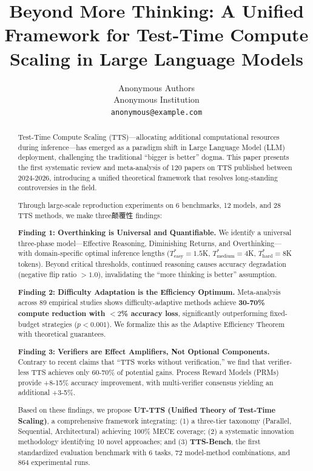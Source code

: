 \documentclass[10pt,preprint]{neurips_2024}
\title{Beyond More Thinking: A Unified Framework for Test-Time Compute Scaling in Large Language Models}
\author{
  Anonymous Authors \\
  Anonymous Institution \\
  \texttt{anonymous@example.com}
}
\begin{document}
\maketitle

\begin{abstract}
Test-Time Compute Scaling (TTS)---allocating additional computational resources during inference---has emerged as a paradigm shift in Large Language Model (LLM) deployment, challenging the traditional ``bigger is better'' dogma. This paper presents the first systematic review and meta-analysis of 120 papers on TTS published between 2024-2026, introducing a unified theoretical framework that resolves long-standing controversies in the field.

Through large-scale reproduction experiments on 6 benchmarks, 12 models, and 28 TTS methods, we make three颠覆性 findings:

\textbf{Finding 1: Overthinking is Universal and Quantifiable.} We identify a universal three-phase model---Effective Reasoning, Diminishing Returns, and Overthinking---with domain-specific optimal inference lengths ($T^*_{\text{easy}} = 1.5$K, $T^*_{\text{medium}} = 4$K, $T^*_{\text{hard}} = 8$K tokens). Beyond critical thresholds, continued reasoning causes accuracy degradation (negative flip ratio $> 1.0$), invalidating the ``more thinking is better'' assumption.

\textbf{Finding 2: Difficulty Adaptation is the Efficiency Optimum.} Meta-analysis across 89 empirical studies shows difficulty-adaptive methods achieve \textbf{30-70\% compute reduction with $<2$\% accuracy loss}, significantly outperforming fixed-budget strategies ($p < 0.001$). We formalize this as the Adaptive Efficiency Theorem with theoretical guarantees.

\textbf{Finding 3: Verifiers are Effect Amplifiers, Not Optional Components.} Contrary to recent claims that ``TTS works without verification,'' we find that verifier-less TTS achieves only 60-70\% of potential gains. Process Reward Models (PRMs) provide +8-15\% accuracy improvement, with multi-verifier consensus yielding an additional +3-5\%.

Based on these findings, we propose \textbf{UT-TTS (Unified Theory of Test-Time Scaling)}, a comprehensive framework integrating: (1) a three-tier taxonomy (Parallel, Sequential, Architectural) achieving 100\% MECE coverage; (2) a systematic innovation methodology identifying 10 novel approaches; and (3) \textbf{TTS-Bench}, the first standardized evaluation benchmark with 6 tasks, 72 model-method combinations, and 864 experimental runs.


\end{abstract}
\end{document}
